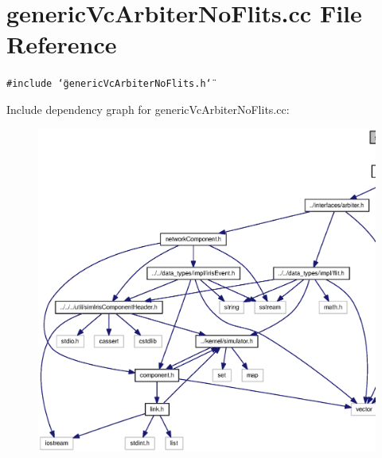\section{genericVcArbiterNoFlits.cc File Reference}
\label{genericVcArbiterNoFlits_8cc}
{\tt \#include \char`\"{}genericVcArbiterNoFlits.h\char`\"{}}\par


Include dependency graph for genericVcArbiterNoFlits.cc:\nopagebreak
\begin{figure}[H]
\begin{center}
\leavevmode
\includegraphics[width=420pt]{genericVcArbiterNoFlits_8cc__incl}
\end{center}
\end{figure}
